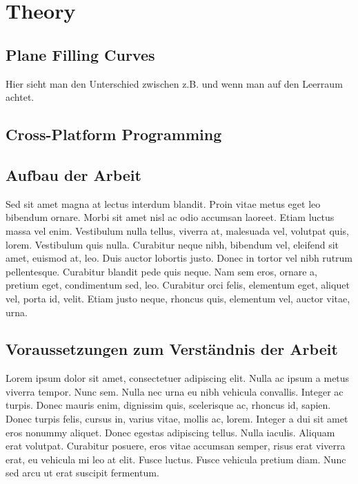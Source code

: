\chapter{Theory}
\label{cha:theory}

\section{Plane Filling Curves}
Hier sieht man den Unterschied zwischen z.B. und \zB wenn man auf den Leerraum achtet.


\section{Cross-Platform Programming}

\section{Aufbau der Arbeit}
Sed sit amet magna at lectus interdum blandit. Proin vitae metus eget leo bibendum ornare. Morbi sit amet nisl ac odio accumsan laoreet. Etiam luctus massa vel enim. Vestibulum nulla tellus, viverra at, malesuada vel, volutpat quis, lorem. Vestibulum quis nulla. Curabitur neque nibh, bibendum vel, eleifend sit amet, euismod at, leo. Duis auctor lobortis justo. Donec in tortor vel nibh rutrum pellentesque. Curabitur blandit pede quis neque. Nam sem eros, ornare a, pretium eget, condimentum sed, leo. Curabitur orci felis, elementum eget, aliquet vel, porta id, velit. Etiam justo neque, rhoncus quis, elementum vel, auctor vitae, urna.

\section{Voraussetzungen zum Verständnis der Arbeit}
Lorem ipsum dolor sit amet, consectetuer adipiscing elit. Nulla ac ipsum a metus viverra tempor. Nunc sem. Nulla nec urna eu nibh vehicula convallis. Integer ac turpis. Donec mauris enim, dignissim quis, scelerisque ac, rhoncus id, sapien. Donec turpis felis, cursus in, varius vitae, mollis ac, lorem. Integer a dui sit amet eros nonummy aliquet. Donec egestas adipiscing tellus. Nulla iaculis. Aliquam erat volutpat. Curabitur posuere, eros vitae accumsan semper, risus erat viverra erat, eu vehicula mi leo at elit. Fusce luctus. Fusce vehicula pretium diam. Nunc sed arcu ut erat suscipit fermentum.

